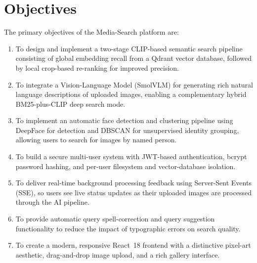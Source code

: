 \documentclass[12pt,a4paper,oneside]{report}
\begin{document}
\section{Objectives}
The primary objectives of the Media-Search platform are:
\begin{enumerate}[leftmargin=*]
  \item To design and implement a two-stage CLIP-based semantic search
        pipeline consisting of global embedding recall from a Qdrant vector
        database, followed by local crop-based re-ranking for improved
        precision.
  \item To integrate a Vision-Language Model (SmolVLM) for generating rich
        natural language descriptions of uploaded images, enabling a
        complementary hybrid BM25-plus-CLIP deep search mode.
  \item To implement an automatic face detection and clustering pipeline
        using DeepFace for detection and DBSCAN for unsupervised identity
        grouping, allowing users to search for images by named person.
  \item To build a secure multi-user system with JWT-based authentication,
        bcrypt password hashing, and per-user filesystem and
        vector-database isolation.
  \item To deliver real-time background processing feedback using
        Server-Sent Events (SSE), so users see live status updates
        as their uploaded images are processed through the AI pipeline.
  \item To provide automatic query spell-correction and query suggestion
        functionality to reduce the impact of typographic errors on
        search quality.
  \item To create a modern, responsive React~18 frontend with a distinctive
        pixel-art aesthetic, drag-and-drop image upload, and a rich gallery
        interface.
\end{enumerate}
\end{document}
